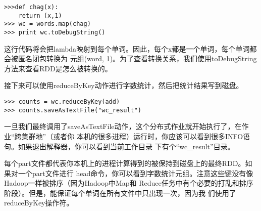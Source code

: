 \begin{lstlisting}
>>>def chag(x):
    return (x,1)
>>> wc = words.map(chag)
>>> print wc.toDebugString()
\end{lstlisting}

这行代码将会把lambda映射到每个单词。因此，每个x都是一个单词，每个单词都会被匿名闭包转换为
元组(word,
1)。为了查看转换关系，我们使用toDebugString方法来查看RDD是怎么被转换的。

接下来可以使用reduceByKey动作进行字数统计，然后把统计结果写到磁盘。

\begin{lstlisting}
>>> counts = wc.reduceByKey(add)
>>> counts.saveAsTextFile("wc_result")
\end{lstlisting}

一旦我们最终调用了saveAsTextFile动作，这个分布式作业就开始执行了，在作业``跨集群地''（或者你
本机的很多进程）运行时，你应该可以看到很多INFO语句。如果退出解释器，你可以看到当前工作目录
下有个``wc\_result''目录。

每个part文件都代表你本机上的进程计算得到的被保持到磁盘上的最终RDD。如果对一个part文件进行
head命令，你可以看到字数统计元组。注意这些键没有像Hadoop一样被排序（因为Hadoop中Map和
Reduce任务中有个必要的打乱和排序阶段）。但是，能保证每个单词在所有文件中只出现一次，因为我
们使用了reduceByKey操作符。
